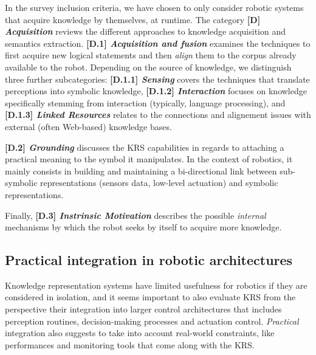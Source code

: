 \documentclass[journal]{IEEEtran}
\newcommand{\taxon}[2]{%
    \textbf{[#1] \emph{#2}}
}
\begin{document}
In the survey inclusion criteria, we have chosen to only consider robotic
systems that acquire knowledge by themselves, at runtime. The category
\taxon{D}{Acquisition} reviews the different approaches to knowledge acquisition
and semantics extraction. \taxon{D.1}{Acquisition and fusion} examines the
techniques to first acquire new logical statements and then \emph{align} them to
the corpus already available to the robot. Depending on the source of knowledge,
we distinguish three further subcategories: \taxon{D.1.1}{Sensing} covers the
techniques that translate perceptions into symbolic knowledge,
\taxon{D.1.2}{Interaction} focuses on knowledge specifically stemming from
interaction (typically, language processing), and \taxon{D.1.3}{Linked
Resources} relates to the connections and alignement issues with external
(often Web-based) knowledge bases.

\taxon{D.2}{Grounding} discusses the KRS capabilities in regards to attaching a
practical meaning to the symbol it manipulates. In the context of robotics, it
mainly consists in building and maintaining a bi-directional link between
sub-symbolic representations (sensors data, low-level actuation) and symbolic
representations.

Finally, \taxon{D.3}{Instrinsic Motivation} describes the possible
\emph{internal} mechanisms by which the robot seeks by itself to acquire more
knowledge.


\subsection{Practical integration in robotic architectures}
\label{sect|integration-robot}

Knowledge representation systems have limited usefulness for robotics if they are
considered in isolation, and it seems important to also evaluate KRS from the
perspective their integration into larger control architectures that includes
perception routines, decision-making processes and actuation control.
\emph{Practical} integration also suggests to take into account real-world
constraints, like performances and monitoring tools that come along with the KRS.
\end{document}
